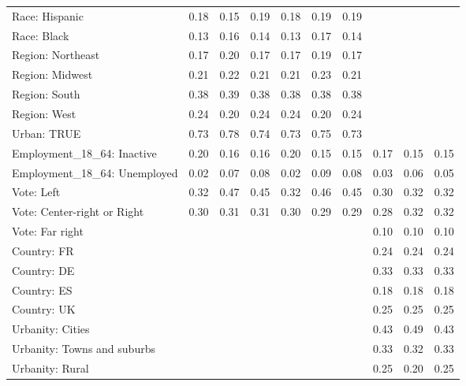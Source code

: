 \begin{tabular}[t]{llllllllll}
Race: Hispanic & 0.18 & 0.15 & 0.19 & 0.18 & 0.19 & 0.19 &  &  & \\
Race: Black & 0.13 & 0.16 & 0.14 & 0.13 & 0.17 & 0.14 &  &  & \\
\addlinespace
Region: Northeast & 0.17 & 0.20 & 0.17 & 0.17 & 0.19 & 0.17 &  &  & \\
Region: Midwest & 0.21 & 0.22 & 0.21 & 0.21 & 0.23 & 0.21 &  &  & \\
Region: South & 0.38 & 0.39 & 0.38 & 0.38 & 0.38 & 0.38 &  &  & \\
Region: West & 0.24 & 0.20 & 0.24 & 0.24 & 0.20 & 0.24 &  &  & \\
\addlinespace
Urban: TRUE & 0.73 & 0.78 & 0.74 & 0.73 & 0.75 & 0.73 &  &  & \\
\addlinespace
Employment\_18\_64: Inactive & 0.20 & 0.16 & 0.16 & 0.20 & 0.15 & 0.15 & 0.17 & 0.15 & 0.15\\
Employment\_18\_64: Unemployed & 0.02 & 0.07 & 0.08 & 0.02 & 0.09 & 0.08 & 0.03 & 0.06 & 0.05\\
\addlinespace
Vote: Left & 0.32 & 0.47 & 0.45 & 0.32 & 0.46 & 0.45 & 0.30 & 0.32 & 0.32\\
Vote: Center-right or Right & 0.30 & 0.31 & 0.31 & 0.30 & 0.29 & 0.29 & 0.28 & 0.32 & 0.32\\
Vote: Far right &  &  &  &  &  &  & 0.10 & 0.10 & 0.10\\
\addlinespace
Country: FR &  &  &  &  &  &  & 0.24 & 0.24 & 0.24\\
Country: DE &  &  &  &  &  &  & 0.33 & 0.33 & 0.33\\
Country: ES &  &  &  &  &  &  & 0.18 & 0.18 & 0.18\\
Country: UK &  &  &  &  &  &  & 0.25 & 0.25 & 0.25\\
\addlinespace
Urbanity: Cities &  &  &  &  &  &  & 0.43 & 0.49 & 0.43\\
Urbanity: Towns and suburbs &  &  &  &  &  &  & 0.33 & 0.32 & 0.33\\
Urbanity: Rural &  &  &  &  &  &  & 0.25 & 0.20 & 0.25\\
\bottomrule
\end{tabular}